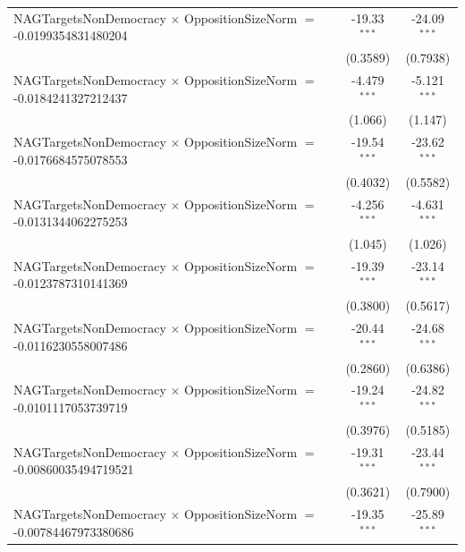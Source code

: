 \begin{tabular}{lcc}
   NAGTargetsNonDemocracy $\times$ OppositionSizeNorm $=$ -0.0199354831480204   & -19.33$^{***}$       & -24.09$^{***}$\\   
                                                                                & (0.3589)             & (0.7938)\\   
   NAGTargetsNonDemocracy $\times$ OppositionSizeNorm $=$ -0.0184241327212437   & -4.479$^{***}$       & -5.121$^{***}$\\   
                                                                                & (1.066)              & (1.147)\\   
   NAGTargetsNonDemocracy $\times$ OppositionSizeNorm $=$ -0.0176684575078553   & -19.54$^{***}$       & -23.62$^{***}$\\   
                                                                                & (0.4032)             & (0.5582)\\   
   NAGTargetsNonDemocracy $\times$ OppositionSizeNorm $=$ -0.0131344062275253   & -4.256$^{***}$       & -4.631$^{***}$\\   
                                                                                & (1.045)              & (1.026)\\   
   NAGTargetsNonDemocracy $\times$ OppositionSizeNorm $=$ -0.0123787310141369   & -19.39$^{***}$       & -23.14$^{***}$\\   
                                                                                & (0.3800)             & (0.5617)\\   
   NAGTargetsNonDemocracy $\times$ OppositionSizeNorm $=$ -0.0116230558007486   & -20.44$^{***}$       & -24.68$^{***}$\\   
                                                                                & (0.2860)             & (0.6386)\\   
   NAGTargetsNonDemocracy $\times$ OppositionSizeNorm $=$ -0.0101117053739719   & -19.24$^{***}$       & -24.82$^{***}$\\   
                                                                                & (0.3976)             & (0.5185)\\   
   NAGTargetsNonDemocracy $\times$ OppositionSizeNorm $=$ -0.00860035494719521  & -19.31$^{***}$       & -23.44$^{***}$\\   
                                                                                & (0.3621)             & (0.7900)\\   
   NAGTargetsNonDemocracy $\times$ OppositionSizeNorm $=$ -0.00784467973380686  & -19.35$^{***}$       & -25.89$^{***}$\\   

\end{tabular}
